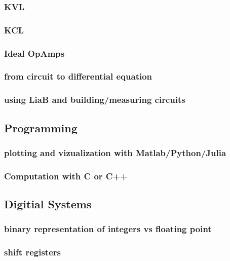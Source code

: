 \documentclass{article}
\begin{document}
\subsubsection{KVL}

\subsubsection{KCL}

\subsubsection{Ideal OpAmps}

\subsubsection{from circuit to differential equation}

\subsubsection{using LiaB and building/measuring circuits}

\subsection{Programming}

\subsubsection{plotting and vizualization with Matlab/Python/Julia}

\subsubsection{Computation with C or C++}

\subsection{Digitial Systems}

\subsubsection{binary representation of integers vs floating point}

\subsubsection{shift registers}
\end{document}
